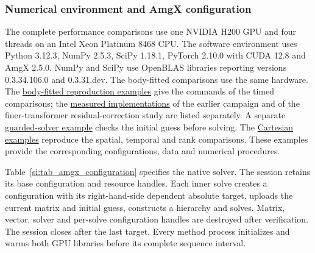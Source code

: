 \subsubsection{Numerical environment and AmgX configuration}
\label{si:cht_environment}
The complete performance comparisons use one NVIDIA H200 GPU and
four threads on an Intel Xeon Platinum 8468 CPU. The software
environment uses Python 3.12.3, NumPy 2.5.3, SciPy 1.18.1,
PyTorch 2.10.0 with CUDA 12.8 and AmgX 2.5.0. NumPy and SciPy use
OpenBLAS libraries reporting versions 0.3.34.106.0 and 0.3.31.dev.
The body-fitted comparisons use the same hardware.
The \href{https://github.com/teeratornk/deflation-example/blob/ba682dd05b168d2f43ff0c58050813deee785223/docs/mesh-showcases.md#reproduce-the-current-comparisons}
{body-fitted reproduction examples} give the commands of the timed comparisons; the
\href{https://github.com/teeratornk/deflation-example/blob/ba682dd05b168d2f43ff0c58050813deee785223/docs/mesh-showcases.md#reproduce-the-measured-implementations}
{measured implementations} of the earlier campaign and of the finer-transformer
residual-correction study are listed separately. A separate
\href{https://github.com/teeratornk/deflation-example/blob/ba682dd05b168d2f43ff0c58050813deee785223/docs/mesh-showcases.md#use-the-recommended-guarded-solver}
{guarded-solver example} checks the initial guess before solving.
The \href{https://github.com/teeratornk/deflation-example/blob/ba682dd05b168d2f43ff0c58050813deee785223/docs/reference-policy-study.md#frozen-complete-optimization-campaign}
{Cartesian examples} reproduce the spatial, temporal and rank comparisons.
These examples provide the corresponding configurations, data and numerical procedures.

Table~\ref{si:tab_amgx_configuration} specifies the native solver.
The session retains its base configuration and resource handles.
Each inner solve creates a configuration with its right-hand-side
dependent absolute target, uploads the current matrix and initial
guess, constructs a hierarchy and solves. Matrix, vector, solver
and per-solve configuration handles are destroyed after verification.
The session closes after the last target. Every method process
initializes and warms both GPU libraries before its complete
sequence interval.

